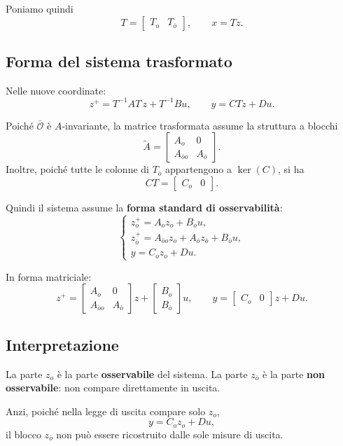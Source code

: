 Poniamo quindi
\[
T=\begin{bmatrix}T_o & T_{\bar o}\end{bmatrix},
\qquad
x=Tz.
\]

\subsection{Forma del sistema trasformato}

Nelle nuove coordinate:
\[
z^+=T^{-1}AT\,z+T^{-1}Bu,
\qquad
y=CTz+Du.
\]

Poiché \(\bar{\mathcal O}\) è \(A\)-invariante, la matrice trasformata assume la struttura a blocchi
\[
\widetilde A=
\begin{bmatrix}
A_o & 0\\
A_{\bar o o} & A_{\bar o}
\end{bmatrix}.
\]
Inoltre, poiché tutte le colonne di \(T_{\bar o}\) appartengono a \(\ker(C)\), si ha
\[
CT=
\begin{bmatrix}
C_o & 0
\end{bmatrix}.
\]

Quindi il sistema assume la \textbf{forma standard di osservabilità}:
\[
\boxed{
\begin{cases}
z_o^+ = A_o z_o + B_o u,\\
z_{\bar o}^+ = A_{\bar o o} z_o + A_{\bar o} z_{\bar o} + B_{\bar o} u,\\
y = C_o z_o + Du.
\end{cases}
}
\]

In forma matriciale:
\[
\boxed{
z^+=
\begin{bmatrix}
A_o & 0\\
A_{\bar o o} & A_{\bar o}
\end{bmatrix} z
+
\begin{bmatrix}
B_o\\
B_{\bar o}
\end{bmatrix}u,
\qquad
y=
\begin{bmatrix}
C_o & 0
\end{bmatrix}z+Du.
}
\]

\subsection{Interpretazione}

La parte \(z_o\) è la parte \textbf{osservabile} del sistema.  
La parte \(z_{\bar o}\) è la parte \textbf{non osservabile}: non compare direttamente in uscita.

Anzi, poiché nella legge di uscita compare solo \(z_o\),
\[
y=C_oz_o+Du,
\]
il blocco \(z_{\bar o}\) non può essere ricostruito dalle sole misure di uscita.

